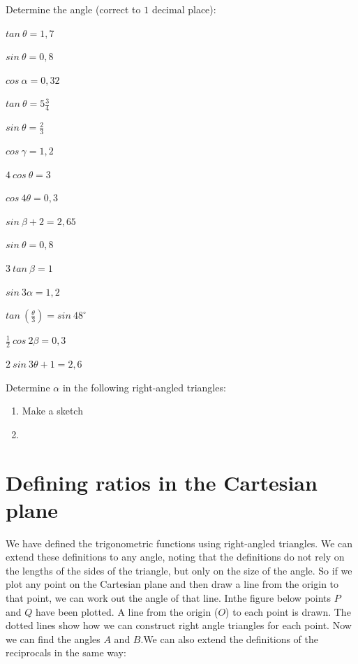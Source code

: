 \begin{exercises}{}
{
Determine the angle (correct to $1$ decimal place):
   \begin{enumerate}[noitemsep, label=\textbf{\arabic*}. ] 
\begin{multicols}{2}
 \item $tan~\theta = 1,7$
\item $sin~\theta = 0,8$
\item $cos~\alpha = 0,32$
\item $tan~\theta = 5\frac{3}{4}$
\item $sin~\theta = \frac{2}{3}$
\item $cos~\gamma = 1,2$
\item $4~cos~\theta = 3$
\item $cos~4\theta = 0,3$
\item $sin~\beta + 2= 2,65$
\item $sin~\theta = 0,8$
\item $3 ~tan~\beta = 1$
\item $sin~3\alpha = 1,2$
\item $tan~(\frac{\theta}{3}) = sin~48^{\circ}$
\item $\frac{1}{2}~cos~2\beta = 0,3$
\item $2~sin~3\theta +1= 2,6$
\end{multicols}
\end{enumerate}

Determine $\alpha$ in the following right-angled triangles:
 \begin{enumerate}[noitemsep, label=\textbf{\arabic*}. ] 

 \item Make a sketch 
 \item 
\end{enumerate}
}
\end{exercises}


\section{Defining ratios in the Cartesian plane}

We have defined the trigonometric functions using right-angled triangles. We can extend these definitions to any angle, noting that the definitions do not rely on the lengths of the sides of the triangle, but only on the size of the angle. So if we plot any point on the Cartesian plane and then draw a line from the origin to that point, we can work out the angle of that line. Inthe figure below points $P$ and $Q$ have been plotted. A line from the origin ($O$) to each point is drawn. The dotted lines show how we can construct right angle triangles for each point. Now we can find the angles $A$ and $B$.We can also extend the definitions of the reciprocals in the same way:
\label{m39411*id89342}\nopagebreak\noindent{}

